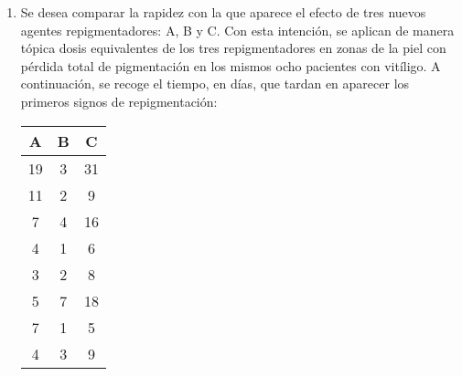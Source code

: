 \begin{enumerate}
\begin{enumerate}
\begin{indicacion}
{}
\end{indicacion}

\item Repetir el ANCOVA con la comparación de medias, tanto reales como estimadas, pero suponiendo que los Kg perdidos por los que han seguido la dieta 1 son: 6,3; 3,8; 8,1; 4,3; 3,1; 4,3; 8,6; 5,2. Obtener también el diagrama de dispersión con el código de colores según dieta.

\begin{indicacion}{Seguir exactamente los mismos pasos que en los puntos anteriores del ejercicio.
}

\end{indicacion}

\end{enumerate}

\item Se desea comparar la rapidez con la que aparece el efecto de tres nuevos agentes repigmentadores: A, B y C. Con esta intención, se aplican de manera tópica dosis equivalentes de los tres repigmentadores en zonas de la piel con pérdida total de pigmentación en los mismos ocho pacientes con vitíligo. A continuación, se recoge el tiempo, en días, que tardan en aparecer los primeros signos de repigmentación:


\begin{center}
\begin{tabular}{|l|l|l|}
\hline
\multicolumn{1}{|c|}{A} & \multicolumn{1}{c|}{B} & \multicolumn{1}{c|}{C} \\
\hline
\multicolumn{1}{|c|}{19} & \multicolumn{1}{c|}{3} & \multicolumn{1}{c|}{31} \\
\hline
\multicolumn{1}{|c|}{11} & \multicolumn{1}{c|}{2} & \multicolumn{1}{c|}{9} \\
\hline
\multicolumn{1}{|c|}{7} & \multicolumn{1}{c|}{4} & \multicolumn{1}{c|}{16} \\
\hline
\multicolumn{1}{|c|}{4} & \multicolumn{1}{c|}{1} & \multicolumn{1}{c|}{6} \\
\hline
\multicolumn{1}{|c|}{3} & \multicolumn{1}{c|}{2} & \multicolumn{1}{c|}{8} \\
\hline
\multicolumn{1}{|c|}{5} & \multicolumn{1}{c|}{7} & \multicolumn{1}{c|}{18} \\
\hline
\multicolumn{1}{|c|}{7} & \multicolumn{1}{c|}{1} & \multicolumn{1}{c|}{5} \\
\hline
\multicolumn{1}{|c|}{4} & \multicolumn{1}{c|}{3} & \multicolumn{1}{c|}{9} \\
\hline
\end{tabular}


\end{center}
\end{enumerate}
